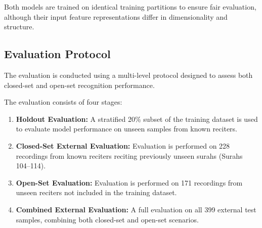 \documentclass[conference]{IEEEtran}
\begin{document}
Both models are trained on identical training partitions to ensure fair evaluation, although their input feature representations differ in dimensionality and structure.

\begin{table}[htbp]
\centering
\caption{Model training configurations for Random Forest and BLSTM classifiers.}
\label{table2}
\renewcommand{\arraystretch}{1.2}
\setlength{\tabcolsep}{4pt}
\end{table}

\subsection{Evaluation Protocol}

The evaluation is conducted using a multi-level protocol designed to assess both closed-set and open-set recognition performance.

The evaluation consists of four stages:

\begin{enumerate}
\item \textbf{Holdout Evaluation:} A stratified 20\% subset of the training dataset is used to evaluate model performance on unseen samples from known reciters.
\item \textbf{Closed-Set External Evaluation:} Evaluation is performed on 228 recordings from known reciters reciting previously unseen surahs (Surahs 104--114).
\item \textbf{Open-Set Evaluation:} Evaluation is performed on 171 recordings from unseen reciters not included in the training dataset.
\item \textbf{Combined External Evaluation:} A full evaluation on all 399 external test samples, combining both closed-set and open-set scenarios.
\end{enumerate}
\end{document}
